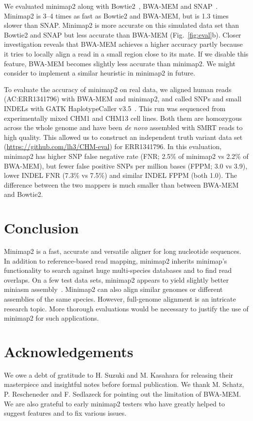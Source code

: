\documentclass{bioinfo}
\begin{document}
We evaluated minimap2 along with Bowtie2~\citep{Langmead:2012fk}, BWA-MEM and
SNAP~\citep{Zaharia:2011aa}. Minimap2 is 3--4 times as fast as Bowtie2 and
BWA-MEM, but is 1.3 times slower than SNAP. Minimap2 is more accurate on this
simulated data set than Bowtie2 and SNAP but less accurate than BWA-MEM
(Fig.~\ref{fig:eval}b). Closer investigation reveals that BWA-MEM achieves
a higher accuracy partly because it tries to locally align a read in a small
region close to its mate. If we disable this feature, BWA-MEM becomes slightly
less accurate than minimap2. We might consider to implement a similar heuristic
in minimap2 in future.

To evaluate the accuracy of minimap2 on real data, we aligned human reads
(AC:ERR1341796) with BWA-MEM and minimap2, and called SNPs and small INDELs
with GATK HaplotypeCaller v3.5~\citep{Depristo:2011vn}. This run was sequenced
from experimentally mixed CHM1 and CHM13 cell lines. Both them are homozygous
across the whole genome and have been \emph{de novo} assembled with SMRT reads
to high quality.  This allowed us to construct an independent truth variant
data set
(\href{https://github.com/lh3/CHM-eval}{https://github.com/lh3/CHM-eval}) for
ERR1341796. In this evaluation, minimap2 has higher SNP false negative rate
(FNR; 2.5\% of minimap2 vs 2.2\% of BWA-MEM), but fewer false positive SNPs per
million bases (FPPM; 3.0 vs 3.9), lower INDEL FNR (7.3\% vs 7.5\%) and similar
INDEL FPPM (both 1.0). The difference between the two mappers is much smaller
than between BWA-MEM and Bowtie2.

\section{Conclusion}

Minimap2 is a fast, accurate and versatile aligner for long nucleotide
sequences.  In addition to reference-based read mapping, minimap2 inherits
minimap's functionality to search against huge multi-species databases and to
find read overlaps. On a few test data sets, minimap2 appears to yield slightly
better miniasm assembly~\citep{Li:2016aa}. Minimap2 can also align similar
genomes or different assemblies of the same species. However, full-genome
alignment is an intricate research topic. More thorough evaluations would be
necessary to justify the use of minimap2 for such applications.

\section*{Acknowledgements}
We owe a debt of gratitude to H. Suzuki and M. Kasahara for releasing their
masterpiece and insightful notes before formal publication. We thank M.
Schatz, P. Rescheneder and F. Sedlazeck for pointing out the limitation of
BWA-MEM. We are also grateful to early minimap2 testers who have greatly helped
to suggest features and to fix various issues.


\end{document}
